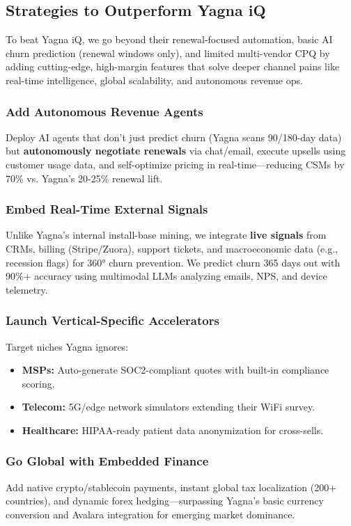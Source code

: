 \documentclass[12pt,a4paper]{article}
\begin{document}
\subsection{Strategies to Outperform Yagna iQ}
To beat Yagna iQ, we go beyond their renewal-focused automation, basic AI churn prediction (renewal windows only), and limited multi-vendor CPQ by adding cutting-edge, high-margin features that solve deeper channel pains like real-time intelligence, global scalability, and autonomous revenue ops.

\subsubsection{Add Autonomous Revenue Agents}
Deploy AI agents that don't just predict churn (Yagna scans 90/180-day data) but \textbf{autonomously negotiate renewals} via chat/email, execute upsells using customer usage data, and self-optimize pricing in real-time—reducing CSMs by 70\% vs. Yagna's 20-25\% renewal lift.

\subsubsection{Embed Real-Time External Signals}
Unlike Yagna's internal install-base mining, we integrate \textbf{live signals} from CRMs, billing (Stripe/Zuora), support tickets, and macroeconomic data (e.g., recession flags) for 360° churn prevention. We predict churn 365 days out with 90\%+ accuracy using multimodal LLMs analyzing emails, NPS, and device telemetry.

\subsubsection{Launch Vertical-Specific Accelerators}
Target niches Yagna ignores:
\begin{itemize}
    \item \textbf{MSPs:} Auto-generate SOC2-compliant quotes with built-in compliance scoring.
    \item \textbf{Telecom:} 5G/edge network simulators extending their WiFi survey.
    \item \textbf{Healthcare:} HIPAA-ready patient data anonymization for cross-sells.
\end{itemize}

\subsubsection{Go Global with Embedded Finance}
Add native crypto/stablecoin payments, instant global tax localization (200+ countries), and dynamic forex hedging—surpassing Yagna's basic currency conversion and Avalara integration for emerging market dominance.
\end{document}
